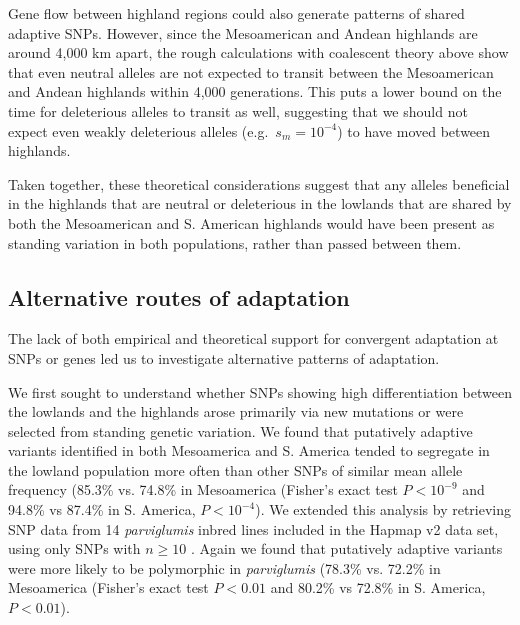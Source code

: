 Gene flow between highland regions could also generate patterns of shared adaptive SNPs.
However, 
since the Mesoamerican and Andean highlands are around 4,000 km apart, 
the rough calculations with coalescent theory above show that even neutral alleles are not expected to transit between the Mesoamerican and Andean highlands within 4,000 generations.
This puts a lower bound on the time for deleterious alleles to transit as well, suggesting that we should not expect even weakly deleterious alleles (e.g.\ $s_m=10^{-4}$) to have moved between highlands.

Taken together, these theoretical considerations suggest that any alleles beneficial in the highlands that are neutral or deleterious in the lowlands that are shared by both the Mesoamerican and S. American highlands would have been present as standing variation in both populations, rather than passed between them.



\subsection*{Alternative routes of adaptation}
The lack of both empirical and theoretical support for convergent adaptation at SNPs or genes led us to investigate alternative patterns of adaptation. 

We first sought to understand whether SNPs showing high differentiation between the lowlands and the highlands arose primarily via new mutations or were selected from standing genetic variation.  
We found that putatively adaptive variants identified in both Mesoamerica and S. America tended to segregate in the lowland population more often than other SNPs of similar mean allele frequency (85.3\% vs. 74.8\% in Mesoamerica (Fisher's exact test $P < 10^{-9}$ and 94.8\% vs 87.4\% in S. America,  $P< 10^{-4}$).  
We extended this analysis by retrieving SNP data from 14 \emph{parviglumis} inbred lines included in the Hapmap v2 data set, using only SNPs with $n\geq10$ \cite[]{Chia_2012_22660545,Hufford_2012_22660546}.  
Again we found that putatively adaptive variants were more likely to be polymorphic in \emph{parviglumis} (78.3\% vs. 72.2\% in Mesoamerica 
(Fisher's exact test $P < 0.01$ and 80.2\% vs 72.8\% in S. America,  $P< 0.01$). 

